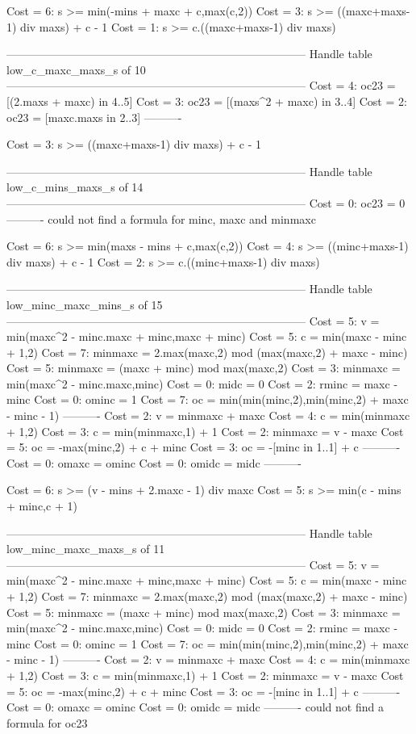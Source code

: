 Cost =  6:  s >= min(-mins + maxc + c,max(c,2))
Cost =  3:  s >= ((maxc+maxs-1) div maxs) + c - 1
Cost =  1:  s >= c.((maxc+maxs-1) div maxs)

--------------------------------------------------------------------------------
Handle table low_c_maxc_maxs_s of 10
--------------------------------------------------------------------------------
Cost =  4:  oc23 = [(2.maxs + maxc) in 4..5]
Cost =  3:  oc23 = [(maxs^2 + maxc) in 3..4]
Cost =  2:  oc23 = [maxc.maxs in 2..3]
----------

Cost =  3:  s >= ((maxc+maxs-1) div maxs) + c - 1

--------------------------------------------------------------------------------
Handle table low_c_mins_maxs_s of 14
--------------------------------------------------------------------------------
Cost =  0:  oc23    = 0
----------
could not find a formula for minc, maxc and minmaxc

Cost =  6:  s >= min(maxs - mins + c,max(c,2))
Cost =  4:  s >= ((minc+maxs-1) div maxs) + c - 1
Cost =  2:  s >= c.((minc+maxs-1) div maxs)

--------------------------------------------------------------------------------
Handle table low_minc_maxc_mins_s of 15
--------------------------------------------------------------------------------
Cost =  5:  v       = min(maxc^2 - minc.maxc + minc,maxc + minc)
Cost =  5:  c       = min(maxc - minc + 1,2)
Cost =  7:  minmaxc = 2.max(maxc,2) mod (max(maxc,2) + maxc - minc)
Cost =  5:  minmaxc = (maxc + minc) mod max(maxc,2)
Cost =  3:  minmaxc = min(maxc^2 - minc.maxc,minc)
Cost =  0:  midc    = 0
Cost =  2:  rminc   = maxc - minc
Cost =  0:  ominc   = 1
Cost =  7:  oc      = min(min(minc,2),min(minc,2) + maxc - minc - 1)
----------
Cost =  2:  v       = minmaxc + maxc
Cost =  4:  c       = min(minmaxc + 1,2)
Cost =  3:  c       = min(minmaxc,1) + 1
Cost =  2:  minmaxc = v - maxc
Cost =  5:  oc      = -max(minc,2) + c + minc
Cost =  3:  oc      = -[minc in 1..1] + c
----------
Cost =  0:  omaxc   = ominc
Cost =  0:  omidc   = midc
----------

Cost =  6:  s >= (v - mins + 2.maxc - 1) div maxc
Cost =  5:  s >= min(c - mins + minc,c + 1)

--------------------------------------------------------------------------------
Handle table low_minc_maxc_maxs_s of 11
--------------------------------------------------------------------------------
Cost =  5:  v       = min(maxc^2 - minc.maxc + minc,maxc + minc)
Cost =  5:  c       = min(maxc - minc + 1,2)
Cost =  7:  minmaxc = 2.max(maxc,2) mod (max(maxc,2) + maxc - minc)
Cost =  5:  minmaxc = (maxc + minc) mod max(maxc,2)
Cost =  3:  minmaxc = min(maxc^2 - minc.maxc,minc)
Cost =  0:  midc    = 0
Cost =  2:  rminc   = maxc - minc
Cost =  0:  ominc   = 1
Cost =  7:  oc      = min(min(minc,2),min(minc,2) + maxc - minc - 1)
----------
Cost =  2:  v       = minmaxc + maxc
Cost =  4:  c       = min(minmaxc + 1,2)
Cost =  3:  c       = min(minmaxc,1) + 1
Cost =  2:  minmaxc = v - maxc
Cost =  5:  oc      = -max(minc,2) + c + minc
Cost =  3:  oc      = -[minc in 1..1] + c
----------
Cost =  0:  omaxc   = ominc
Cost =  0:  omidc   = midc
----------
could not find a formula for oc23


